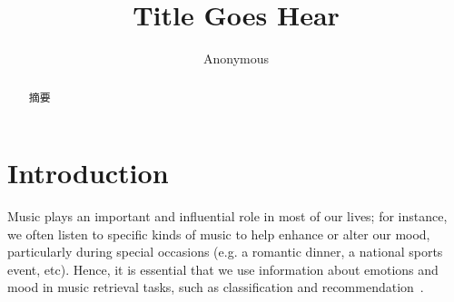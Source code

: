 \documentclass{llncs}
\begin{document}
	
\title{Title Goes Hear}
\author{Anonymous}
\maketitle

\begin{abstract}
摘要
\end{abstract}


\section{Introduction}


Music plays an important and influential role in most of our lives; for instance, we often listen to specific kinds of music to help enhance or alter our mood, particularly during special occasions (e.g. a romantic dinner, a national sports event, etc). Hence, it is essential that we use information about emotions and mood in music retrieval tasks, such as classification and recommendation~\cite{li}. 
\end{document}
